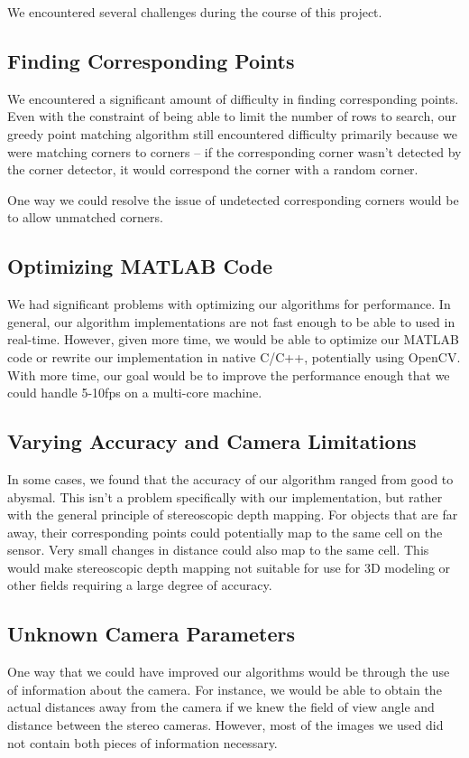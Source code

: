 We encountered several challenges during the course of this project. 
\subsection{Finding Corresponding Points}
We encountered a significant amount of difficulty in finding corresponding points. Even with the constraint of being able to limit the number of rows to search, our greedy point matching algorithm still encountered difficulty primarily because we were matching corners to corners -- if the corresponding corner wasn't detected by the corner detector, it would correspond the corner with a random corner. 

One way we could resolve the issue of undetected corresponding corners would be to allow unmatched corners. 

\subsection{Optimizing MATLAB Code}
We had significant problems with optimizing our algorithms for performance. In general, our algorithm implementations are not fast enough to be able to used in real-time. However, given more time, we would be able to optimize our MATLAB code or rewrite our implementation in native C/C++, potentially using OpenCV. With more time, our goal would be to improve the performance enough that we could handle 5-10fps on a multi-core machine. 

\subsection{Varying Accuracy and Camera Limitations}
In some cases, we found that the accuracy of our algorithm ranged from good to abysmal. This isn't a problem specifically with our implementation, but rather with the general principle of stereoscopic depth mapping. For objects that are far away, their corresponding points could potentially map to the same cell on the sensor. Very small changes in distance could also map to the same cell. This would make stereoscopic depth mapping not suitable for use for 3D modeling or other fields requiring a large degree of accuracy. 

\subsection{Unknown Camera Parameters}
One way that we could have improved our algorithms would be through the use of information about the camera. For instance, we would be able to obtain the actual distances away from the camera if we knew the field of view angle and distance between the stereo cameras. However, most of the images we used did not contain both pieces of information necessary.